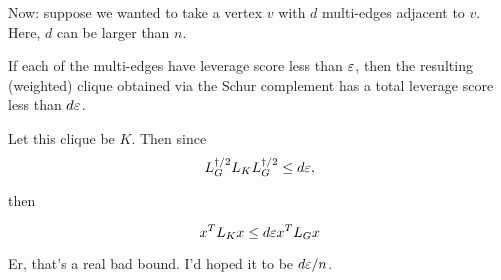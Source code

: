 Now: suppose we wanted to take a vertex $v$ with $d$ multi-edges
adjacent to $v$. Here, $d$ can be larger than $n$.

If each of the multi-edges have leverage score less than $\varepsilon$, then
the resulting (weighted) clique obtained via the Schur complement
has a total leverage score less than $d\varepsilon$.

Let this clique be $K$. Then since 
\[ L_G^{\dag/2} L_K L_G^{\dag/2} \leq d\varepsilon,\]

then 

\[x^T L_K x \leq d\varepsilon x^T L_G x \]

Er, that's a real bad bound. I'd hoped it to be $d\varepsilon / n$.

